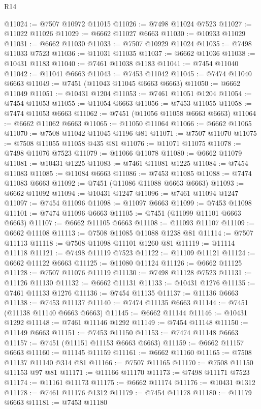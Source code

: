 \begin{lexlean}{R14}
\begin{coremodule}
{{{{{{{{{{{{{{{{{{{{{{{{{{{{{{{{{{{{{{{{{{{{{{{{{{{{{{{{{{{{{{{{{{{{{{{{{{{{{{{{{{@11024 := @7507 @10972 @11015
@11026 := @7498 @11024 @7523
@11027 := @11022 @11026
@11029 := @6662 @11027 @6663
@11030 := @10933 @11029
@11031 := @6662 @11030
@11033 := @7507 @10929 @11024
@11035 := @7498 @11033 @7523
@11036 := @11031 @11035
@11037 := @6662 @11036
@11038 := @10431 @1183
@11040 := @7461 @11038 @1183
@11041 := @7454 @11040
@11042 := @11041 @6663
@11043 := @7453 @11042
@11045 := @7474 @11040 @6663
@11049 := @7451 (@11043 @11045 @6663 @6663)
@11050 := @6662 @11049
@11051 := @10431 @1204
@11053 := @7461 @11051 @1204
@11054 := @7454 @11053
@11055 := @11054 @6663
@11056 := @7453 @11055
@11058 := @7474 @11053 @6663
@11062 := @7451 (@11056 @11058 @6663 @6663)
@11064 := @6662 @11062 @6663
@11065 := @11050 @11064
@11066 := @6662 @11065
@11070 := @7508 @11042 @11045 @1196 @81
@11071 := @7507 @11070
@11075 := @7508 @11055 @11058 @435 @81
@11076 := @11071 @11075
@11078 := @7498 @11076 @7523
@11079 := @11066 @11078
@11080 := @6662 @11079
@11081 := @10431 @1225
@11083 := @7461 @11081 @1225
@11084 := @7454 @11083
@11085 := @11084 @6663
@11086 := @7453 @11085
@11088 := @7474 @11083 @6663
@11092 := @7451 (@11086 @11088 @6663 @6663)
@11093 := @6662 @11092
@11094 := @10431 @1247
@11096 := @7461 @11094 @1247
@11097 := @7454 @11096
@11098 := @11097 @6663
@11099 := @7453 @11098
@11101 := @7474 @11096 @6663
@11105 := @7451 (@11099 @11101 @6663 @6663)
@11107 := @6662 @11105 @6663
@11108 := @11093 @11107
@11109 := @6662 @11108
@11113 := @7508 @11085 @11088 @1238 @81
@11114 := @7507 @11113
@11118 := @7508 @11098 @11101 @1260 @81
@11119 := @11114 @11118
@11121 := @7498 @11119 @7523
@11122 := @11109 @11121
@11124 := @6662 @11122 @6663
@11125 := @11080 @11124
@11126 := @6662 @11125
@11128 := @7507 @11076 @11119
@11130 := @7498 @11128 @7523
@11131 := @11126 @11130
@11132 := @6662 @11131
@11133 := @10431 @1276
@11135 := @7461 @11133 @1276
@11136 := @7454 @11135
@11137 := @11136 @6663
@11138 := @7453 @11137
@11140 := @7474 @11135 @6663
@11144 := @7451 (@11138 @11140 @6663 @6663)
@11145 := @6662 @11144
@11146 := @10431 @1292
@11148 := @7461 @11146 @1292
@11149 := @7454 @11148
@11150 := @11149 @6663
@11151 := @7453 @11150
@11153 := @7474 @11148 @6663
@11157 := @7451 (@11151 @11153 @6663 @6663)
@11159 := @6662 @11157 @6663
@11160 := @11145 @11159
@11161 := @6662 @11160
@11165 := @7508 @11137 @11140 @314 @81
@11166 := @7507 @11165
@11170 := @7508 @11150 @11153 @97 @81
@11171 := @11166 @11170
@11173 := @7498 @11171 @7523
@11174 := @11161 @11173
@11175 := @6662 @11174
@11176 := @10431 @1312
@11178 := @7461 @11176 @1312
@11179 := @7454 @11178
@11180 := @11179 @6663
@11181 := @7453 @11180
}}}}}}}}}}}}}}}}}}}}}}}}}}}}}}}}}}}}}}}}}}}}}}}}}}}}}}}}}}}}}}}}}}}}}}}}}}}}}}}}}}
\end{coremodule}
\end{lexlean}
